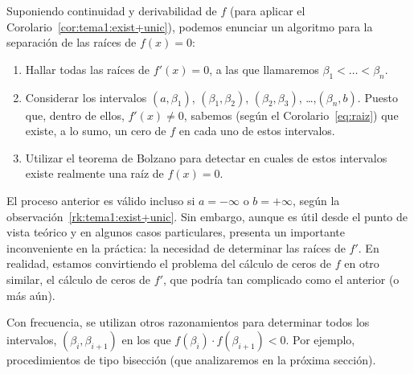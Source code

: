 \begin{remark}
  \label{rk:tema1:separac-ceros}
  Suponiendo continuidad y derivabilidad de $f$ (para
  aplicar el Corolario~\ref{cor:tema1:exist+unic}), %
  podemos enunciar un algoritmo para la separación de las raíces de
  $f(x)=0$:
  \begin{enumerate}
  \item Hallar todas las raíces de $f'(x)=0$, a las que llamaremos
    $\beta_1<\dots<\beta_n$.
  \item Considerar los intervalos $(a,\beta_1)$, $(\beta_1,\beta_2)$,
    $(\beta_2,\beta_3)$, \dots,$(\beta_n,b)$. Puesto que, dentro de
    ellos, $f'(x)\neq 0$, sabemos (según el Corolario~\eqref{eq:raiz})
    que existe, a lo sumo, un cero de $f$ en cada uno de estos
    intervalos.
  \item Utilizar el teorema de Bolzano para detectar en cuales de
    estos intervalos existe realmente una raíz de $f(x)=0$.
  \end{enumerate}
  El proceso anterior es válido incluso si $a=-\infty$ o $b=+\infty$,
  según la observación~\ref{rk:tema1:exist+unic}.  Sin embargo, aunque es
  útil desde el punto de vista teórico y en algunos casos
  particulares, presenta un importante inconveniente en la práctica:
  la necesidad de determinar las raíces de  $f'$.  En
  realidad, estamos convirtiendo el problema del cálculo de ceros de
  $f$ en otro similar, el cálculo de ceros de $f'$, que podría tan
  complicado como el anterior (o más aún).
\end{remark}
Con frecuencia, se utilizan otros razonamientos para determinar
todos los intervalos, $(\beta_i,\beta_{i+1})$ en los que
$f(\beta_i)\cdot f(\beta_{i+1})<0$. Por ejemplo, procedimientos de
tipo bisección (que analizaremos en la próxima sección).


